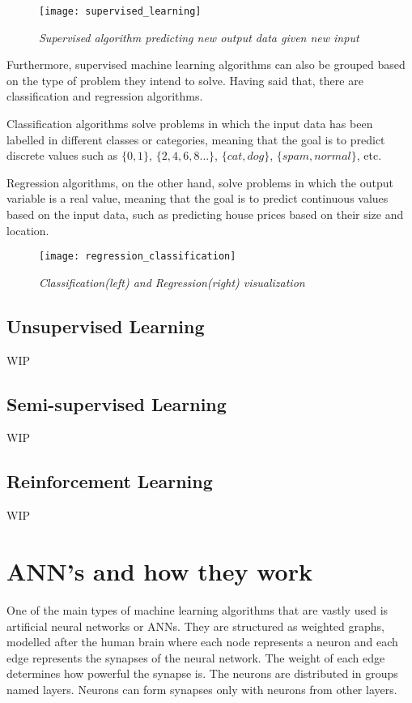 \begin{figure}[h]
    \centering
    \texttt{[image: supervised\_learning]}
    \caption{\emph{Supervised algorithm predicting new output data given new input  \cite{typesML}}}
    \label{fig:supervised}
\end{figure}

Furthermore, supervised machine learning algorithms can also
be grouped based on the type of problem they intend to solve.
Having said that, there are classification and regression algorithms.

Classification algorithms solve problems in which the input data has
been labelled in different classes or categories,
meaning that the goal  is to predict discrete values
such as $\{0, 1\}$, $\{2, 4, 6, 8\dots\}$, $\{cat, dog\}$, $\{spam, normal\}$, etc.

Regression algorithms, on the other hand, solve problems in which the output variable
is a real value, meaning that the goal is to predict continuous values based on the
input data, such as predicting house prices based on their size and location.

\begin{figure}[h]
    \centering
    \texttt{[image: regression\_classification]}
    \caption{\emph{Classification(left) and Regression(right) visualization  \cite{bigDataR}}}
    \label{fig:regression_classification}
\end{figure}


\subsection{Unsupervised Learning}
WIP







\subsection{Semi-supervised Learning}
WIP
\subsection{Reinforcement Learning}
WIP

\section{ANN's and how they work}
One of the main types of machine learning algorithms that are vastly used is
artificial neural networks or ANNs.
They are structured as weighted graphs, modelled after the
human brain where each node represents a neuron and each
edge represents the synapses of the neural network.
The weight of each edge determines how powerful the synapse is.
The neurons are distributed in groups named layers.
Neurons can form synapses only with neurons from other layers.
\vspace{0.5cm}

